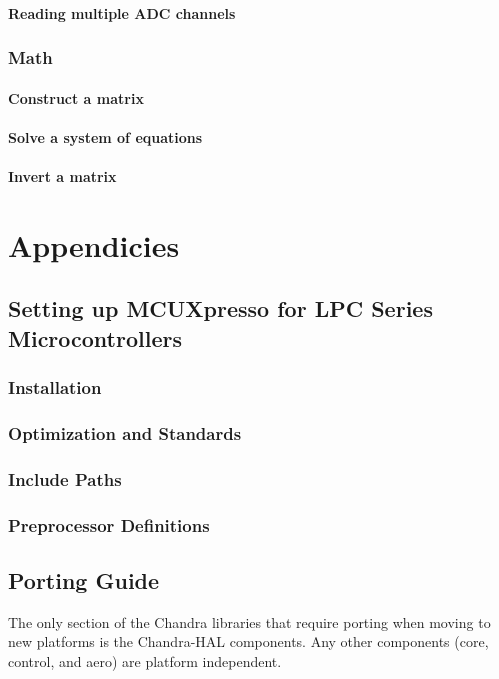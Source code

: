 \documentclass[12pt,letterpaper,article]{memoir} %
\begin{document}
\subsection{Reading multiple ADC channels}

\section{Math}
\subsection{Construct a matrix}
\subsection{Solve a system of equations}
\subsection{Invert a matrix}

\appendix
\part{Appendicies}

\chapter{Setting up MCUXpresso for LPC Series Microcontrollers}
\section{Installation}
\section{Optimization and Standards}
\section{Include Paths}
\section{Preprocessor Definitions}

\chapter{Porting Guide}
The only section of the Chandra libraries that require porting when moving to new platforms is the Chandra-HAL components.  Any other components (core, control, and aero) are platform independent.
\end{document}
